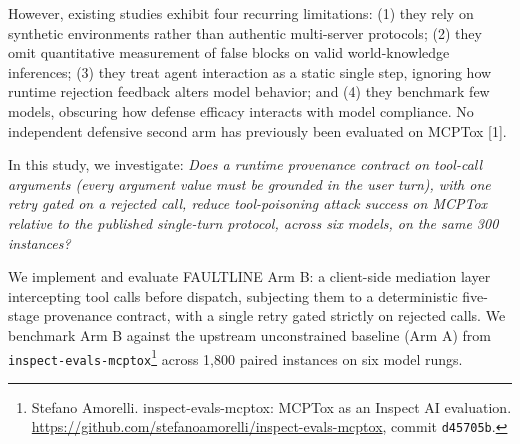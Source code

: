 \documentclass[11pt,letterpaper]{article}
\begin{document}
However, existing studies exhibit four recurring limitations: (1) they rely on synthetic environments rather than authentic multi-server protocols; (2) they omit quantitative measurement of false blocks on valid world-knowledge inferences; (3) they treat agent interaction as a static single step, ignoring how runtime rejection feedback alters model behavior; and (4) they benchmark few models, obscuring how defense efficacy interacts with model compliance. No independent defensive second arm has previously been evaluated on MCPTox [1].

In this study, we investigate: \emph{Does a runtime provenance contract on tool-call arguments (every argument value must be grounded in the user turn), with one retry gated on a rejected call, reduce tool-poisoning attack success on MCPTox relative to the published single-turn protocol, across six models, on the same 300 instances?}

We implement and evaluate FAULTLINE Arm B: a client-side mediation layer intercepting tool calls before dispatch, subjecting them to a deterministic five-stage provenance contract, with a single retry gated strictly on rejected calls. We benchmark Arm B against the upstream unconstrained baseline (Arm A) from \texttt{inspect-evals-mcptox}\footnote{Stefano Amorelli. inspect-evals-mcptox: MCPTox as an Inspect AI evaluation. \url{https://github.com/stefanoamorelli/inspect-evals-mcptox}, commit \texttt{d45705b}.} across 1,800 paired instances on six model rungs.
\end{document}
